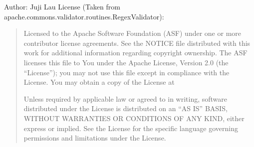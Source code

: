\documentclass[letterpaper,10pt,english]{sphinxmanual}
\begin{document}
\sphinxAtStartPar
Author: Juji Lau
License (Taken from apache.commons.validator.routines.RegexValidator):
\begin{quote}

\sphinxAtStartPar
Licensed to the Apache Software Foundation (ASF) under one or more
contributor license agreements. See the NOTICE file distributed with
this work for additional information regarding copyright ownership.
The ASF licenses this file to You under the Apache License, Version 2.0
(the “License”); you may not use this file except in compliance with
the License. You may obtain a copy of the License at
\begin{quote}

\sphinxAtStartPar
{}
\end{quote}

\sphinxAtStartPar
Unless required by applicable law or agreed to in writing, software
distributed under the License is distributed on an “AS IS” BASIS,
WITHOUT WARRANTIES OR CONDITIONS OF ANY KIND, either express or implied.
See the License for the specific language governing permissions and
limitations under the License.
\end{quote}
\end{document}
